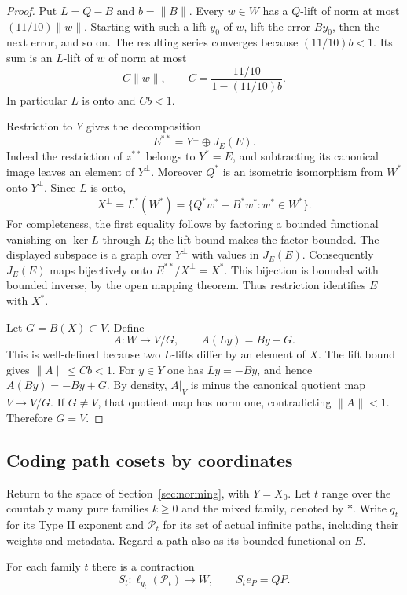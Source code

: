 \begin{proof}
Put $L=Q-B$ and $b=\|B\|$. Every $w\in W$ has a $Q$-lift of norm at most
$(11/10)\|w\|$. Starting with such a lift $y_0$ of $w$, lift the error
$By_0$, then the next error, and so on. The resulting series converges
because $(11/10)b<1$. Its sum is an $L$-lift of $w$ of norm at most
\begin{equation}\label{eq:lift-constant}
 C\|w\|,\qquad C=\frac{11/10}{1-(11/10)b}.
\end{equation}
In particular $L$ is onto and $Cb<1$.

Restriction to $Y$ gives the decomposition
\[
 E^{**}=Y^\perp\oplus J_E(E).
\]
Indeed the restriction of $z^{**}$ belongs to $Y^*=E$, and subtracting
its canonical image leaves an element of $Y^\perp$. Moreover $Q^*$ is
an isometric isomorphism from $W^*$ onto $Y^\perp$. Since $L$ is onto,
\[
 X^\perp=L^*(W^*)=\{Q^*w^*-B^*w^*:w^*\in W^*\}.
\]
For completeness, the first equality follows by factoring a bounded
functional vanishing on $\ker L$ through $L$; the lift bound makes the
factor bounded. The displayed subspace is a graph over $Y^\perp$ with
values in $J_E(E)$. Consequently $J_E(E)$ maps bijectively onto
$E^{**}/X^\perp=X^*$. This bijection is bounded with bounded inverse,
by the open mapping theorem. Thus restriction identifies $E$ with $X^*$.

Let $G=\overline{B(X)}\subset V$. Define
\[
 A:W\longrightarrow V/G,\qquad A(Ly)=By+G.
\]
This is well-defined because two $L$-lifts differ by an element of $X$.
The lift bound gives $\|A\|\le Cb<1$. For $y\in Y$ one has
$Ly=-By$, and hence $A(By)=-By+G$. By density, $A|_V$ is minus the
canonical quotient map $V\to V/G$. If $G\ne V$, that quotient map has
norm one, contradicting $\|A\|<1$. Therefore $G=V$.
\end{proof}

\subsection{Coding path cosets by coordinates}

Return to the space of Section~\ref{sec:norming}, with $Y=X_0$.
Let $t$ range over the countably many pure families $k\ge0$ and the mixed
family, denoted by $*$. Write $q_t$ for its Type II exponent and
$\mathcal P_t$ for its set of actual infinite paths, including their
weights and metadata. Regard a path also as its bounded functional on $E$.

\begin{lemma}\label{twist:path-map}
For each family $t$ there is a contraction
\[
 S_t:\ell_{q_t}(\mathcal P_t)\longrightarrow W,
 \qquad S_te_P=QP.
\]
\end{lemma}

